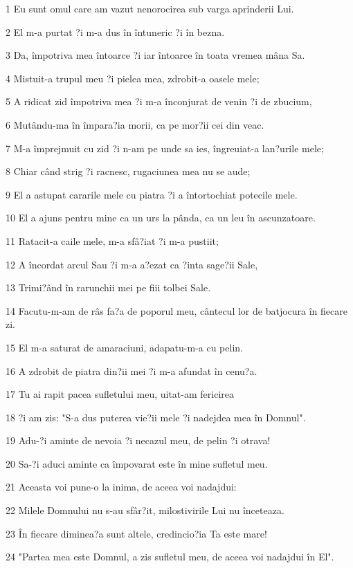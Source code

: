 \par 1 Eu sunt omul care am vazut nenorocirea sub varga aprinderii Lui.
\par 2 El m-a purtat ?i m-a dus în întuneric ?i în bezna.
\par 3 Da, împotriva mea întoarce ?i iar întoarce în toata vremea mâna Sa.
\par 4 Mistuit-a trupul meu ?i pielea mea, zdrobit-a oasele mele;
\par 5 A ridicat zid împotriva mea ?i m-a înconjurat de venin ?i de zbucium,
\par 6 Mutându-ma în împara?ia morii, ca pe mor?ii cei din veac.
\par 7 M-a împrejmuit cu zid ?i n-am pe unde sa ies, îngreuiat-a lan?urile mele;
\par 8 Chiar când strig ?i racnesc, rugaciunea mea nu se aude;
\par 9 El a astupat cararile mele cu piatra ?i a întortochiat potecile mele.
\par 10 El a ajuns pentru mine ca un urs la pânda, ca un leu în ascunzatoare.
\par 11 Ratacit-a caile mele, m-a sfâ?iat ?i m-a pustiit;
\par 12 A încordat arcul Sau ?i m-a a?ezat ca ?inta sage?ii Sale,
\par 13 Trimi?ând în rarunchii mei pe fiii tolbei Sale.
\par 14 Facutu-m-am de râs fa?a de poporul meu, cântecul lor de batjocura în fiecare zi.
\par 15 El m-a saturat de amaraciuni, adapatu-m-a cu pelin.
\par 16 A zdrobit de piatra din?ii mei ?i m-a afundat în cenu?a.
\par 17 Tu ai rapit pacea sufletului meu, uitat-am fericirea
\par 18 ?i am zis: "S-a dus puterea vie?ii mele ?i nadejdea mea în Domnul".
\par 19 Adu-?i aminte de nevoia ?i necazul meu, de pelin ?i otrava!
\par 20 Sa-?i aduci aminte ca împovarat este în mine sufletul meu.
\par 21 Aceasta voi pune-o la inima, de aceea voi nadajdui:
\par 22 Milele Domnului nu s-au sfâr?it, milostivirile Lui nu înceteaza.
\par 23 În fiecare diminea?a sunt altele, credincio?ia Ta este mare!
\par 24 "Partea mea este Domnul, a zis sufletul meu, de aceea voi nadajdui în El".
